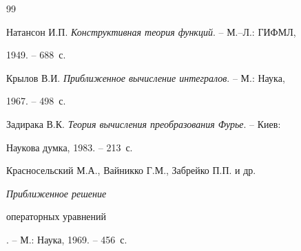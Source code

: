 \begin{thebibliography}{99}


Натансон И.П. {\em Конструктивная теория функций}. -- М.--Л.: ГИФМЛ,


1949. -- 688~с.







Крылов В.И. {\em Приближенное вычисление интегралов}. -- М.: Наука,


1967. -- 498~с.







Задирака В.К. {\em Теория вычисления преобразования Фурье}. -- Киев:


Наукова думка, 1983. -- 213~с.







Красносельский М.А., Вайникко Г.М., Забрейко П.П.  и др.


{\em Приближенное решение


операторных уравнений}. -- М.: Наука, 1969. -- 456~с.





\end{thebibliography} 


 


\vskip 2cm 


 









 


